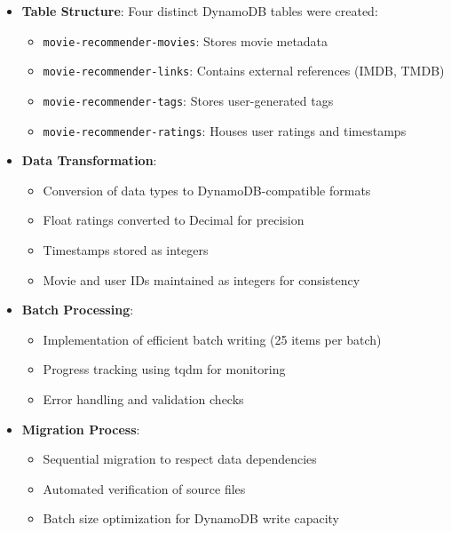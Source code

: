 \documentclass[12pt]{article}
\begin{document}
\begin{itemize}
    \item \textbf{Table Structure}: Four distinct DynamoDB tables were created:
    \begin{itemize}
        \item \texttt{movie-recommender-movies}: Stores movie metadata
        \item \texttt{movie-recommender-links}: Contains external references (IMDB, TMDB)
        \item \texttt{movie-recommender-tags}: Stores user-generated tags
        \item \texttt{movie-recommender-ratings}: Houses user ratings and timestamps
    \end{itemize}
    
    \item \textbf{Data Transformation}: 
    \begin{itemize}
        \item Conversion of data types to DynamoDB-compatible formats
        \item Float ratings converted to Decimal for precision
        \item Timestamps stored as integers
        \item Movie and user IDs maintained as integers for consistency
    \end{itemize}
    
    \item \textbf{Batch Processing}:
    \begin{itemize}
        \item Implementation of efficient batch writing (25 items per batch)
        \item Progress tracking using tqdm for monitoring
        \item Error handling and validation checks
    \end{itemize}
    
    \item \textbf{Migration Process}:
    \begin{itemize}
        \item Sequential migration to respect data dependencies
        \item Automated verification of source files
        \item Batch size optimization for DynamoDB write capacity
    \end{itemize}
\end{itemize}
\end{document}
